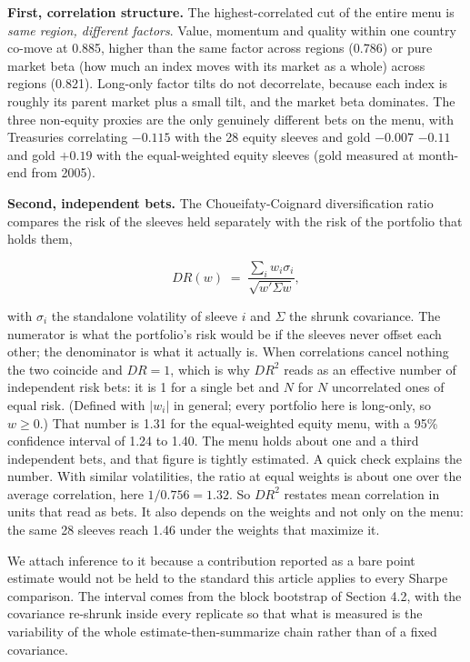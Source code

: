 \documentclass[12pt,letterpaper]{article}
\newcommand{\quita}[1]{{\color{quitarc}#1}}
\newcommand{\nuevo}[1]{{\color{nuevoc}#1}}
\newcommand{\head}[1]{\noindent\textbf{#1}\hspace{0.5em}\ignorespaces}
\begin{document}
\head{First, correlation structure.} The highest-correlated cut of the entire
menu is \emph{same region, different factors}. Value, momentum and quality within
one country co-move at 0.885, higher than the same factor across regions (0.786)
or pure market beta\nuevo{ (how much an index moves with its market as a whole)} across regions (0.821). Long-only factor tilts do not
decorrelate, because each index is roughly its parent market plus a small tilt,
and the market beta dominates. The three non-equity proxies are the only genuinely
different bets on the menu, with Treasuries correlating \quita{$-0.115$ with the 28
equity sleeves and gold $-0.007$} \nuevo{$-0.11$ and gold $+0.19$ with the equal-weighted equity sleeves (gold measured at month-end from 2005)}.

\head{Second, independent bets.} The Choueifaty-Coignard diversification ratio compares the
risk of the sleeves held separately with the risk of the portfolio that holds them,

\begin{equation}
DR(w) \;=\; \frac{\sum_i w_i \sigma_i}{\sqrt{w' \Sigma w}},
\end{equation}

\noindent with $\sigma_i$ the standalone volatility of sleeve $i$ and $\Sigma$ the shrunk
covariance. The numerator is what the portfolio's risk would be if the sleeves never offset each
other; the denominator is what it actually is. When correlations cancel nothing the two coincide
and $DR = 1$, which is why $DR^{2}$ reads as an effective number of independent risk bets: it is
1 for a single bet and $N$ for $N$ uncorrelated ones of equal risk. (Defined with $|w_i|$ in
general; every portfolio here is long-only, so $w \ge 0$.) That number is 1.31 for the
equal-weighted equity menu, with a 95\% confidence interval of 1.24 to 1.40. The menu
holds about one and a third independent bets, and that figure is tightly estimated.\nuevo{ A quick
check explains the number. With similar volatilities, the ratio at equal weights is about one over the
average correlation, here $1/0.756 = 1.32$. So $DR^2$ restates mean correlation in units that read as
bets. It also depends on the weights and not only on the menu: the same 28 sleeves reach 1.46 under
the weights that maximize it.}

We attach inference to it because a contribution reported as a bare point estimate would not be
held to the standard this article applies to every Sharpe comparison. The interval comes from
the block bootstrap of Section 4.2, with the covariance re-shrunk inside every replicate so
that what is measured is the variability of the whole estimate-then-summarize chain rather than
of a fixed covariance.
\end{document}
